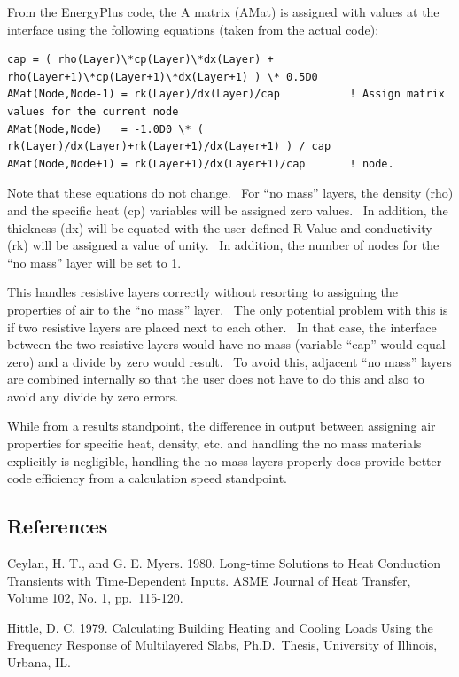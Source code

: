From the EnergyPlus code, the A matrix (AMat) is assigned with values at the interface using the following equations (taken from the actual code):

\begin{lstlisting}
cap = ( rho(Layer)\*cp(Layer)\*dx(Layer) + rho(Layer+1)\*cp(Layer+1)\*dx(Layer+1) ) \* 0.5D0
AMat(Node,Node-1) = rk(Layer)/dx(Layer)/cap           ! Assign matrix values for the current node
AMat(Node,Node)   = -1.0D0 \* ( rk(Layer)/dx(Layer)+rk(Layer+1)/dx(Layer+1) ) / cap
AMat(Node,Node+1) = rk(Layer+1)/dx(Layer+1)/cap       ! node.
\end{lstlisting}

Note that these equations do not change.~ For ``no mass'' layers, the density (rho) and the specific heat (cp) variables will be assigned zero values.~ In addition, the thickness (dx) will be equated with the user-defined R-Value and conductivity (rk) will be assigned a value of unity.~ In addition, the number of nodes for the ``no mass'' layer will be set to 1.

This handles resistive layers correctly without resorting to assigning the properties of air to the ``no mass'' layer.~ The only potential problem with this is if two resistive layers are placed next to each other.~ In that case, the interface between the two resistive layers would have no mass (variable ``cap'' would equal zero) and a divide by zero would result.~ To avoid this, adjacent ``no mass'' layers are combined internally so that the user does not have to do this and also to avoid any divide by zero errors.

While from a results standpoint, the difference in output between assigning air properties for specific heat, density, etc. and handling the no mass materials explicitly is negligible, handling the no mass layers properly does provide better code efficiency from a calculation speed standpoint.

\subsection{References}\label{references-014}

Ceylan, H. T., and G. E. Myers. 1980. Long-time Solutions to Heat Conduction Transients with Time-Dependent Inputs. ASME Journal of Heat Transfer, Volume 102, No. 1, pp.~115-120.

Hittle, D. C. 1979. Calculating Building Heating and Cooling Loads Using the Frequency Response of Multilayered Slabs, Ph.D.~Thesis, University of Illinois, Urbana, IL.

